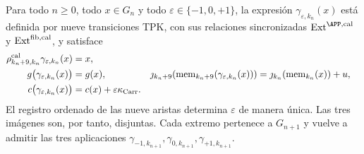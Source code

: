 \begin{lemma}
\label{hmtfg:lem:elevacion-catalogal-nonadica}
Para todo \(n\ge0\), todo \(x\in G_n\) y todo
\(\varepsilon\in\{-1,0,+1\}\), la expresión
\(\gamma_{\varepsilon,k_n}(x)\) está definida por nueve transiciones TPK,
con sus relaciones sincronizadas
\(\operatorname{Ext}^{\APP,\rm cal}\) y
\(\operatorname{Ext}^{\rm fib,cal}\), y satisface
\begin{align}
 \rho^{\rm cal}_{k_n+9,k_n}\gamma_{\varepsilon,k_n}(x)&=x,
 \label{hmtfg:eq:truncamiento-injerto-ch}\\
 g\bigl(\gamma_{\varepsilon,k_n}(x)\bigr)
   &=g(x),&
 \jmath_{k_n+9}\!\left(\operatorname{mem}_{k_n+9}
        (\gamma_{\varepsilon,k_n}(x))\right)
   &=\jmath_{k_n}\!\left(\operatorname{mem}_{k_n}(x)\right)+u,
 \label{hmtfg:eq:fase-memoria-injerto-ch}\\
 c\bigl(\gamma_{\varepsilon,k_n}(x)\bigr)
   &=c(x)+\varepsilon\kappa_{\rm Carr}.&&
 \label{hmtfg:eq:carry-injerto-ch}
\end{align}
\label{hmtfg:eq:tres-vueltas-propiedades-ch}
\label{hmtfg:eq:tres-vueltas-acarreo-ch}
El registro ordenado de las nueve aristas determina \(\varepsilon\) de manera única.
Las tres imágenes son, por tanto, disjuntas. Cada extremo pertenece a
\(G_{n+1}\) y vuelve a admitir las tres aplicaciones
\(\gamma_{-1,k_{n+1}},\gamma_{0,k_{n+1}},
\gamma_{+1,k_{n+1}}\).
\end{lemma}

